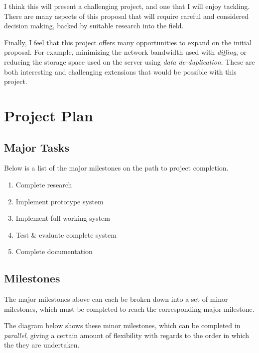 \documentclass[a4paper]{article}
\begin{document}
    I think this will present a challenging project, and one that I will enjoy
    tackling. There are many aspects of this proposal that will require careful
    and considered decision making, backed by suitable research into the field.

    Finally, I feel that this project offers many opportunities to expand on
    the initial proposal. For example, minimizing the network bandwidth used
    with \emph{diffing}, or reducing the storage space used on the server using
    \emph{data de-duplication}. These are both interesting and challenging
    extensions that would be possible with this project.

    \section{Project Plan}

    \subsection{Major Tasks}

    Below is a list of the major milestones on the path to project completion.

    \begin{enumerate}
        \item Complete research
        \item Implement prototype system
        \item Implement full working system
        \item Test \& evaluate complete system
        \item Complete documentation
    \end{enumerate}

    \subsection{Milestones}

    The major milestones above can each be broken down into a set of minor
    milestones, which must be completed to reach the corresponding major
    milestone.

    The diagram below shows these minor milestones, which can be completed in
    \emph{parallel}, giving a certain amount of flexibility with regards to the
    order in which the they are undertaken.
\end{document}

